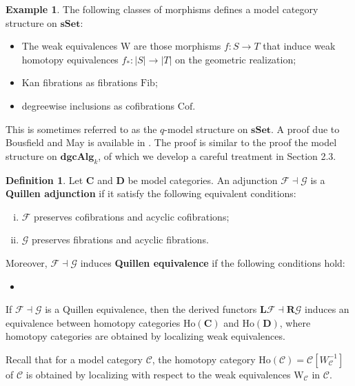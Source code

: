 \documentclass[psamsfonts]{amsart}
\theoremstyle{definition}
\newtheorem{defn}{Definition}[section]
\newtheorem{exmp}{Example}[section]
\newcommand{\sSet}{\mathbf{sSet}}
\newcommand{\dgcAlg}{\mathbf{dgcAlg}}
\newcommand{\Ho}{\mathrm{Ho}}
\newcommand{\W}{\mathrm{W}}
\newcommand{\Fib}{\mathrm{Fib}}
\newcommand{\Cof}{\mathrm{Cof}}
\numberwithin{equation}{section}
\begin{document}
\begin{exmp}
The following classes of morphisms defines a model category structure on $\sSet$:
\begin{itemize}
    \item The weak equivalences $\W$ are those morphisms $f:S\to T$ that induce weak homotopy equivalences $f_\ast:|S|\to|T|$ on the geometric realization;
    \item Kan fibrations as fibrations $\Fib$;
    \item degreewise inclusions as cofibrations $\Cof$.
\end{itemize}
This is sometimes referred to as the $q$-model structure on $\sSet$. A proof due to Bousfield and May is available in \cite{May-Ponto}. The proof is similar to the proof the model structure on $\dgcAlg_k$, of which we develop a careful treatment in Section 2.3.
\end{exmp}

\begin{defn}
Let $\mathbf{C}$ and $\mathbf{D}$ be model categories. An adjunction $\mathcal{F}\dashv\mathcal{G}$ is a \textbf{Quillen adjunction} if it satisfy the following equivalent conditions:\begin{enumerate}[(i)]
    \item $\mathcal{F}$ preserves cofibrations and acyclic cofibrations;
    \item $\mathcal{G}$ preserves fibrations and acyclic fibrations.
\end{enumerate}
Moreover, $\mathcal{F}\dashv\mathcal{G}$ induces \textbf{Quillen equivalence} if the following conditions hold:\begin{itemize}[(i)]
    \item 
\end{itemize}
\end{defn}

If $\mathcal{F}\dashv\mathcal{G}$ is a Quillen equivalence, then the derived functors $\mathbf{L}\mathcal{F}\dashv\mathbf{R}\mathcal{G}$ induces an equivalence between homotopy categories $\Ho(\mathbf{C})$ and $\Ho(\mathbf{D})$, where homotopy categories are obtained by localizing weak equivalences.

Recall that for a model category $\mathcal{C}$, the homotopy category $\Ho(\mathcal{C})=\mathcal{C}[W_\mathcal{C}^{-1}]$ of $\mathcal{C}$ is obtained by localizing with respect to the weak equivalences $\W_\mathcal{C}$ in $\mathcal{C}$.
\end{document}
